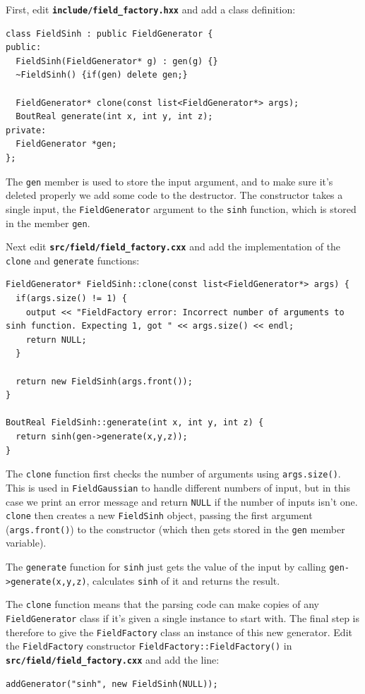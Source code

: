 \documentclass[12pt]{article}
\newcommand{\file}[1]{\texttt{\bf #1}}
\begin{document}
First, edit \file{include/field\_factory.hxx} and add a class definition:
\begin{lstlisting}[firstnumber=122]
  class FieldSinh : public FieldGenerator {
public:
  FieldSinh(FieldGenerator* g) : gen(g) {}
  ~FieldSinh() {if(gen) delete gen;}
  
  FieldGenerator* clone(const list<FieldGenerator*> args);
  BoutReal generate(int x, int y, int z);
private:
  FieldGenerator *gen;
};
\end{lstlisting}

The \lstinline!gen! member is used to store the input argument, and to make sure it's deleted
properly we add some code to the destructor. The constructor takes a single input, the \lstinline!FieldGenerator! argument to the \lstinline!sinh! function, which is stored in the member \lstinline!gen!.

Next edit \file{src/field/field\_factory.cxx} and add the implementation of the \lstinline!clone! and
\lstinline!generate! functions:
\begin{lstlisting}[firstnumber=100]
FieldGenerator* FieldSinh::clone(const list<FieldGenerator*> args) {
  if(args.size() != 1) {
    output << "FieldFactory error: Incorrect number of arguments to sinh function. Expecting 1, got " << args.size() << endl;
    return NULL;
  }
  
  return new FieldSinh(args.front());
}

BoutReal FieldSinh::generate(int x, int y, int z) {
  return sinh(gen->generate(x,y,z));
}
\end{lstlisting}

The \lstinline!clone! function first checks the number of arguments using \lstinline!args.size()!. This
is used in \lstinline!FieldGaussian! to handle different numbers of input, but in this case we 
print an error message and return \lstinline!NULL! if the number of inputs isn't one. \lstinline!clone! then creates
a new \lstinline!FieldSinh! object, passing the first argument (\lstinline!args.front()!) to the constructor (which
then gets stored in the \lstinline!gen! member variable). 

The \lstinline!generate! function for \lstinline!sinh! just gets the value of the input by calling
\lstinline!gen->generate(x,y,z)!, calculates \lstinline!sinh! of it and returns the result.

The \lstinline!clone! function means that the parsing code can make copies of any \lstinline!FieldGenerator! class
if it's given a single instance to start with. The final step is therefore to give the \lstinline!FieldFactory! 
class an instance of this new generator. Edit the \lstinline!FieldFactory! constructor \lstinline!FieldFactory::FieldFactory()! in \file{src/field/field\_factory.cxx} and add the line:
\begin{lstlisting}[firstnumber=196]
addGenerator("sinh", new FieldSinh(NULL));
\end{lstlisting}
\end{document}
